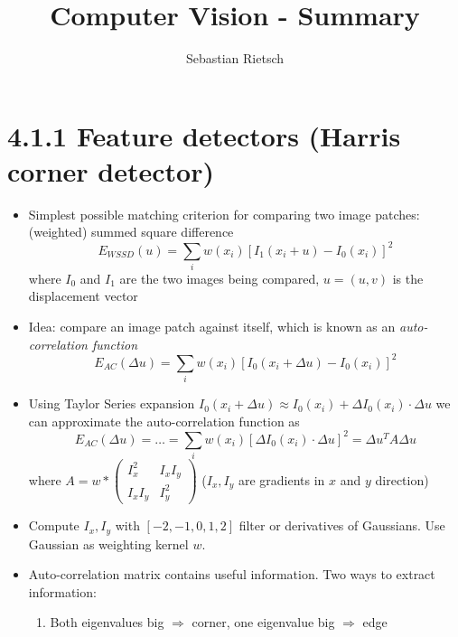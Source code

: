 \documentclass[a4paper]{article}
\title{Computer Vision - Summary}
\author{Sebastian Rietsch}
\begin{document}
\maketitle
\section*{4.1.1 Feature detectors (Harris corner detector)}
\begin{itemize}
    \item
        Simplest possible matching criterion for comparing two image patches: (weighted) summed square difference
        $$E_{WSSD}(u) = \sum_i w(x_i) [I_1 (x_i + u) - I_0(x_i)]^2$$
        where $I_0$ and $I_1$ are the two images being compared, $u = (u,v)$ is the displacement vector
    \item
        Idea: compare an image patch against itself, which is known as an \textit{auto-correlation function}
        $$E_{AC}(\Delta u) = \sum_i w(x_i) [I_0(x_i + \Delta u) - I_0(x_i)]^2$$
    \item
        Using Taylor Series expansion $I_0(x_i + \Delta u) \approx I_0(x_i) + \Delta I_0(x_i) \cdot \Delta u$ we can approximate the auto-correlation function as
        $$E_{AC}(\Delta u) = \dots = \sum_i w(x_i) [\Delta I_0(x_i) \cdot \Delta u]^2 = \Delta u^T A \Delta u$$
        where $A = w * \begin{pmatrix} I_x^2 & I_x I_y \\ I_x I_y & I_y^2  \end{pmatrix}$ ($I_x, I_y$ are gradients in $x$ and $y$ direction)
    \item
        Compute $I_x, I_y$ with $[-2, -1, 0, 1, 2]$ filter or derivatives of Gaussians. Use Gaussian as weighting kernel $w$.
    \item
        Auto-correlation matrix contains useful information. Two ways to extract information:
        \begin{enumerate}
            \item
                Both eigenvalues big $\Rightarrow$ corner, one eigenvalue big $\Rightarrow$ edge


\end{enumerate}
\end{itemize}
\end{document}
